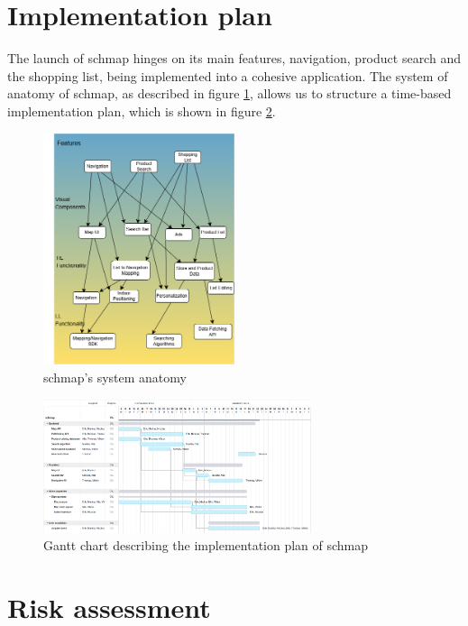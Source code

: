 \documentclass[titlepage]{article}
\begin{document}
\section{Implementation plan}

The launch of schmap hinges on its main features, navigation, product search and the shopping list, being implemented into a cohesive application. The system of anatomy of schmap, as described in figure \ref{fig:sysanat}, allows us to structure a time-based implementation plan, which is shown in figure \ref{fig:ganttchart}.

\begin{figure}[h]
    \centering
    \includegraphics[width=0.5\textwidth]{SystemAnatomy.png}
    \caption{schmap's system anatomy}
    \label{fig:sysanat}
\end{figure}

\begin{figure}[h]
    \centering
    \includegraphics[width=0.7\textwidth]{implementation_plan.png}
    \caption{Gantt chart describing the implementation plan of schmap}
    \label{fig:ganttchart}
\end{figure}




\section{Risk assessment}
\end{document}
